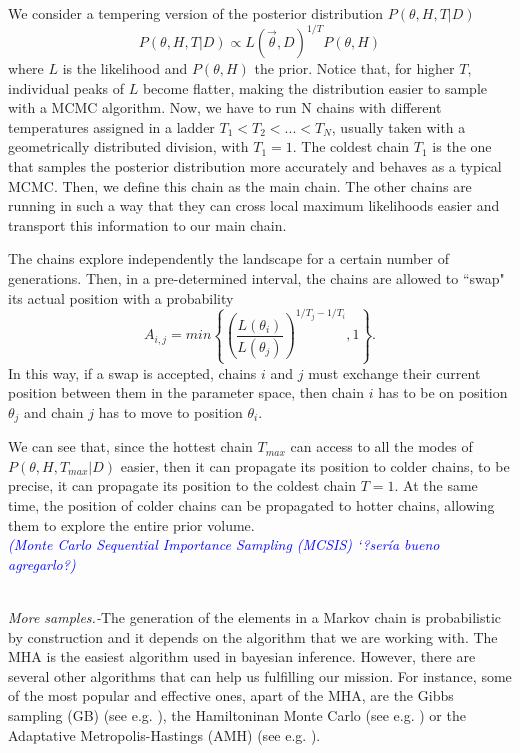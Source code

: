 \documentclass[onecolumn,           %
               showpacs,            %
               preprintnumbers,     %
               aps,                 %
               prl,          	    %
               letterpaper,             %
               superscriptaddress,      %
               nofootinbib,         %
               tightenlines,        %
               floats,floatfix      %
               ,usenatbib,
               ]{revtex4-1}
\begin{document}
We consider a tempering version of the posterior distribution $P(\theta,H,T|D)$
\begin{equation}
P(\theta,H,T|D) \propto L(\vec\theta,D)^{1/T}P(\theta,H)
\end{equation}
where $L$ is the likelihood and $P(\theta,H)$ the prior. Notice that, for higher $T$, individual peaks of $L$ become flatter, making the distribution easier to sample with a MCMC algorithm. Now, we have to run N chains with different temperatures assigned in a ladder $T_1<T_2<...<T_N$, usually taken with a geometrically distributed division, with $T_1=1$. The coldest chain $T_1$ is the one that samples the posterior distribution more accurately and behaves as a typical MCMC. Then, we define this chain as the main chain. The other chains are running in such a way that they can cross local maximum likelihoods easier and transport this information to our main chain.  

The chains explore independently the landscape for a certain number of generations. Then, in a pre-determined interval, the chains are allowed to ``swap" its actual position with a probability
\begin{equation}
A_{i,j}=min\left\lbrace\left(\frac{L(\theta_i)}{L(\theta_j)}\right)^{1/T_j-1/T_i},1\right\rbrace .
\end{equation}
In this way, if a swap is accepted, chains $i$ and $j$ must exchange their current position between them in the parameter space, then chain $i$ has to be on position $\theta_j$ and chain $j$ has to move to position $\theta_i$. 

We can see that, since the hottest chain $T_{max}$ can access to all the modes of $P(\theta,H,T_{max}|D)$ easier, then it can propagate its position to colder chains, to be precise, it can propagate its position to the coldest chain $T=1$. At the same time, the position of colder chains can be propagated to hotter chains, allowing them to explore the entire prior volume.   
\\

\textit{\textcolor{blue}{(Monte Carlo Sequential Importance Sampling (MCSIS) `?ser\'ia bueno agregarlo?)}}
\\ $ $

\textit{More samples.-}The generation of the elements in a Markov chain is probabilistic by construction and it depends on the algorithm that we are working with. The MHA is the easiest algorithm used in bayesian inference. However, there are several other algorithms that can help us fulfilling our mission. For instance, some of the most popular and effective ones, apart of the MHA, are the Gibbs sampling (GB) (see e.g. \cite{gibbs1,gibbs2}), the Hamiltoninan Monte Carlo (see e.g. \cite{hamiltonian1,Hamiltonian2}) or the Adaptative Metropolis-Hastings (AMH) (see e.g. \cite{importance}).\\
 
\end{document}
